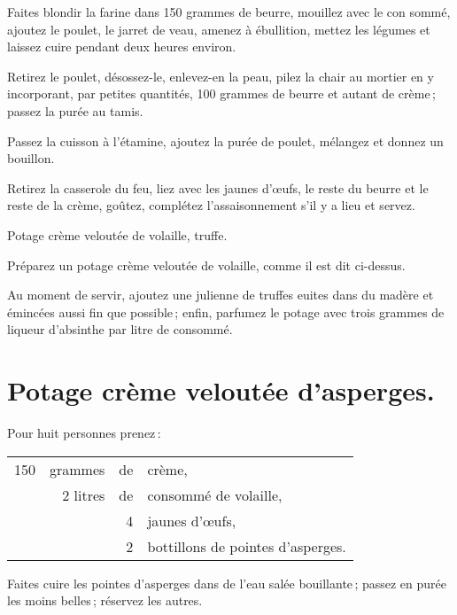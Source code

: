 Faites blondir la farine dans 150 grammes de beurre, mouillez avec le con
sommé, ajoutez le poulet, le jarret de veau, amenez à ébullition, mettez les
légumes et laissez cuire pendant deux heures environ.

Retirez le poulet, désossez-le, enlevez-en la peau, pilez la chair au mortier
en y incorporant, par petites quantités, 100 grammes de beurre et autant de
crème ; passez la purée au tamis. 

Passez la cuisson à l'étamine, ajoutez la purée de poulet, mélangez et donnez
un bouillon. 

Retirez la casserole du feu, liez avec les jaunes d'œufs, le reste du beurre et
le reste de la crème, goûtez, complétez l’assaisonnement s'il y a lieu et
servez.

Potage crème veloutée de volaille, truffe.

Préparez un potage crème veloutée de volaille, comme il est dit ci-dessus.

Au moment de servir, ajoutez une julienne de truffes euites dans du madère et
émincées aussi fin que possible ; enfin, parfumez le potage avec trois grammes de
liqueur d'absinthe par litre de consommé.

\section*{\centering Potage crème veloutée d'asperges.}

Pour huit personnes prenez :

\medskip

\footnotesize
\begin{longtable}{rrrp{16em}}                                                    
    150 & grammes   & de & crème,                                                                         \\
        & 2 litres  & de & consommé de volaille,                                                          \\
        &           &  4 & jaunes d'œufs,                                                                 \\
        &           &  2 & bottillons de pointes d'asperges.                                              \\
\end{longtable}
\normalsize

Faites cuire les pointes d'asperges dans de l'eau salée bouillante ; passez en
purée les moins belles ; réservez les autres.

